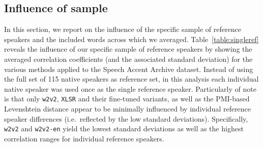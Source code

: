 \documentclass[11pt,a4paper]{article}
\begin{document}
\subsection{Influence of sample}
In this section, we report on the influence of the specific sample of reference speakers and the included words across which we averaged.
Table~\ref{table:singleref} reveals the influence of our specific sample of reference speakers by showing the averaged correlation coefficients (and the associated standard deviation) for the various methods applied to the Speech Accent Archive dataset. Instead of using the full set of 115 native speakers as reference set, in this analysis each individual native speaker was used once as the single reference speaker. Particularly of note is that only \texttt{w2v2}, \texttt{XLSR} and their fine-tuned variants, as well as the PMI-based Levenshtein distance appear to be minimally influenced by individual reference speaker differences (i.e.~reflected by the low standard deviations).
Specifically, \texttt{w2v2} and \texttt{w2v2-en} yield the lowest standard deviations as well as the highest correlation ranges for individual reference speakers.

\end{document}
